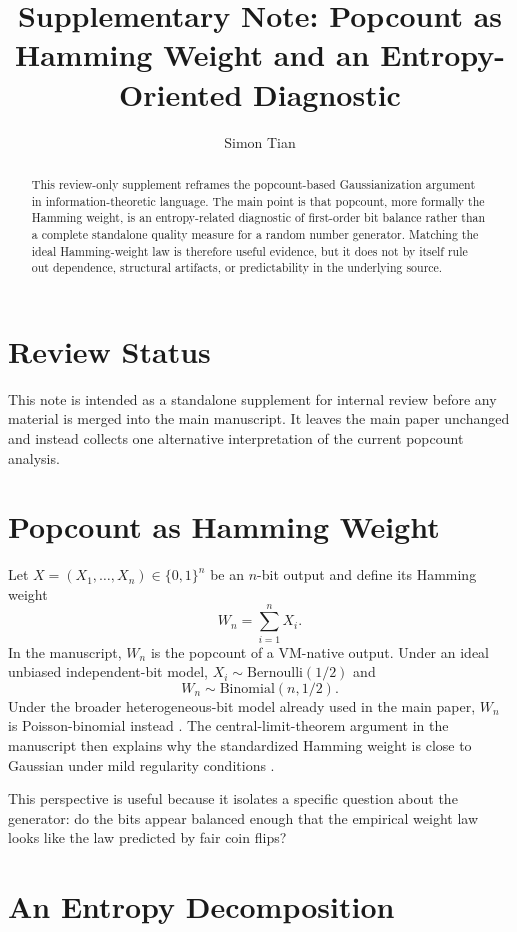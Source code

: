 \documentclass[11pt]{article}
\title{Supplementary Note: Popcount as Hamming Weight and an Entropy-Oriented Diagnostic}
\author{Simon Tian}
\date{}
\begin{document}
\maketitle

\begin{abstract}
This review-only supplement reframes the popcount-based Gaussianization
argument in information-theoretic language. The main point is that popcount,
more formally the Hamming weight, is an entropy-related diagnostic of
first-order bit balance rather than a complete standalone quality measure for a
random number generator. Matching the ideal Hamming-weight law is therefore
useful evidence, but it does not by itself rule out dependence, structural
artifacts, or predictability in the underlying source.
\end{abstract}

\section{Review Status}

This note is intended as a standalone supplement for internal review before any
material is merged into the main manuscript. It leaves the main paper
unchanged and instead collects one alternative interpretation of the current
popcount analysis.

\section{Popcount as Hamming Weight}

Let $X = (X_1,\dots,X_n) \in \{0,1\}^n$ be an $n$-bit output and define its
Hamming weight
\[
W_n = \sum_{i=1}^n X_i.
\]
In the manuscript, $W_n$ is the popcount of a VM-native output. Under an ideal
unbiased independent-bit model, $X_i \sim \mathrm{Bernoulli}(1/2)$ and
\[
W_n \sim \mathrm{Binomial}(n,1/2).
\]
Under the broader heterogeneous-bit model already used in the main paper,
$W_n$ is Poisson-binomial instead \citep{Hong2013}. The central-limit-theorem
argument in the manuscript then explains why the standardized Hamming weight is
close to Gaussian under mild regularity conditions \citep{Durrett2019}.

This perspective is useful because it isolates a specific question about the
generator: do the bits appear balanced enough that the empirical weight law
looks like the law predicted by fair coin flips?

\section{An Entropy Decomposition}
\end{document}
